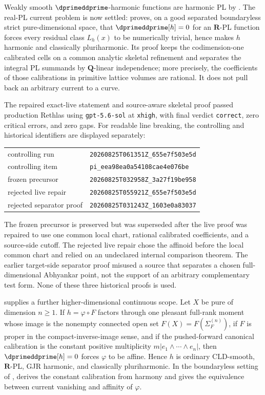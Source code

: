Weakly smooth \(\dprimeddprime\)-harmonic functions are harmonic PL by
\cite[Proposition~10.17]{GJR26}.  The real-PL current problem is now settled:
 proves, on a good separated
boundaryless strict pure-dimensional space, that
\(\dprimeddprime[h]=0\) for an \(\mathbf R\)-PL function forces every residual
class \(L_h(x)\) to be numerically trivial, hence makes \(h\) harmonic and
classically pluriharmonic.  Its proof keeps the codimension-one calibrated
cells on a common analytic skeletal refinement and separates the
integral PL summands by \(\mathbf Q\)-linear independence; more precisely, the
coefficients of those calibrations in primitive lattice volumes are rational.
It does not pull back an arbitrary current to a curve.

The repaired exact-live statement and source-aware skeletal proof passed
production Rethlas using \texttt{gpt-5.6-sol} at \texttt{xhigh}, with final
verdict \texttt{correct}, zero critical errors, and zero gaps.  For readable
line breaking, the controlling and historical identifiers are displayed
separately:
\begin{center}
\small
\begin{tabular}{@{}ll@{}}
controlling run & \nolinkurl{20260825T061351Z_655e7f503e5d}\tabularnewline
controlling item & \nolinkurl{pi_eea98ea0a54108cae4e076be}\tabularnewline
frozen precursor & \nolinkurl{20260825T032958Z_3a27f19be958}\tabularnewline
rejected live repair & \nolinkurl{20260825T055921Z_655e7f503e5d}\tabularnewline
rejected separator proof & \nolinkurl{20260825T031243Z_1603e0a83037}
\end{tabular}
\end{center}
The frozen precursor is preserved but was superseded after the live proof was
repaired to use one common local chart, rational calibrated coefficients, and
a source-side cutoff.  The rejected live repair chose the affinoid before the
local common chart and relied on an undeclared internal comparison theorem.
The earlier target-side separator proof misused a source that separates a
chosen full-dimensional Abhyankar point, not the support of an arbitrary
complementary test form.  None of these three historical proofs is used.

 supplies a further
higher-dimensional continuous scope.  Let \(X\) be pure of dimension
\(n\geq 1\).  If \(h=\varphi\circ F\) factors through one pleasant full-rank
moment whose image is the nonempty connected open set
\(F(X)=F(\Sigma_F^{(n)})\), if \(F\) is proper in the compact-inverse-image
sense, and if the pushed-forward canonical calibration is the constant
positive multiplicity \(m|e_1\wedge\cdots\wedge e_n|\), then
\(\dprimeddprime[h]=0\) forces \(\varphi\) to be affine.  Hence \(h\) is ordinary
CLD-smooth, \(\mathbf R\)-PL, GJR harmonic, and classically pluriharmonic.  In
the boundaryless setting of ,
 derives the
constant calibration from harmony and gives the equivalence between current
vanishing and affinity of \(\varphi\).

